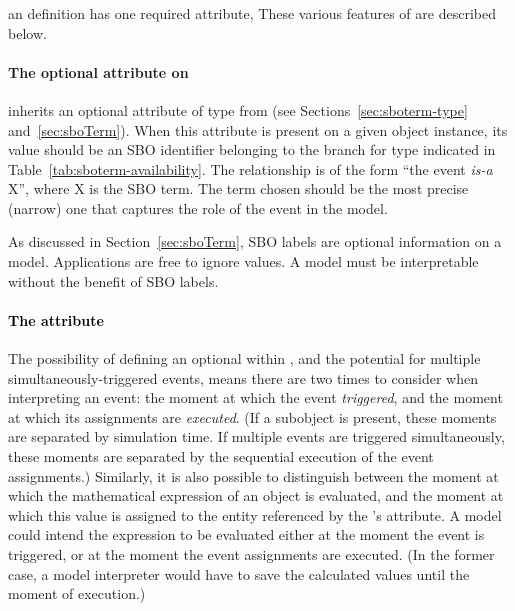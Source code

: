 \subsubsection{}

an \Event definition has one required attribute, 
These various features of \Event are described below.


\paragraph{The optional  attribute on }
\label{sec:event-sboterm}

\Event inherits an optional  attribute of type
 from \SBase (see
Sections~\ref{sec:sboterm-type} and~\ref{sec:sboTerm}).  When this
attribute is present on a given \Event object instance, its value
should be an SBO identifier belonging to the branch for type
\Event indicated in Table~\ref{tab:sboterm-availability}.  The
relationship is of the form ``the event \emph{is-a} X'', where X
is the SBO term.  The term chosen should be the most precise
(narrow) one that captures the role of the event in the model.

As discussed in Section~\ref{sec:sboTerm}, SBO labels are optional
information on a model.  Applications are free to ignore
 values.  A model must be interpretable without the
benefit of SBO labels.


\paragraph{\textcolor{black}{The  attribute}}
\label{sec:event-usevaluesfromtriggertime}

The possibility of defining an optional \Delay within \Event, and
the potential for multiple simultaneously-triggered events, means
there are two times to consider when interpreting an event: the
moment at which the event \emph{triggered}, and the moment at
which its assignments are \emph{executed}.  (If a \Delay subobject
is present, these moments are separated by simulation time.  If
multiple events are triggered simultaneously, these moments are
separated by the sequential execution of the event assignments.)
Similarly, it is also possible to distinguish between the moment at
which the mathematical expression of an \EventAssignment object is
evaluated, and the moment at which this value is assigned to the
entity referenced by the \EventAssignment's 
attribute.  A model could intend the \EventAssignment expression
to be evaluated either at the moment the event is triggered, or at
the moment the event assignments are executed.  (In the former case,
a model interpreter would have to save the calculated values until
the moment of execution.)

